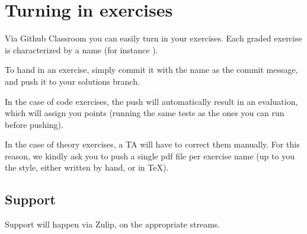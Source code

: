 \section{Turning in exercises}\label{sec:handin_instructions}
Via Github Classroom you can easily turn in your exercises. Each graded exercise is characterized by a name (for instance ).

To hand in an exercise, simply commit it with the name as the commit message, and push it to your solutions branch.

In the case of code exercises, the push will automatically result in an evaluation, which will assign you points (running the same tests as the ones you can run before pushing).

In the case of theory exercises, a TA will have to correct them manually. For this reason, we kindly ask you to push a single pdf file per exercise name (up to you the style, either written by hand, or in TeX).
\subsection{Support}
Support will happen via Zulip, on the appropriate streams.